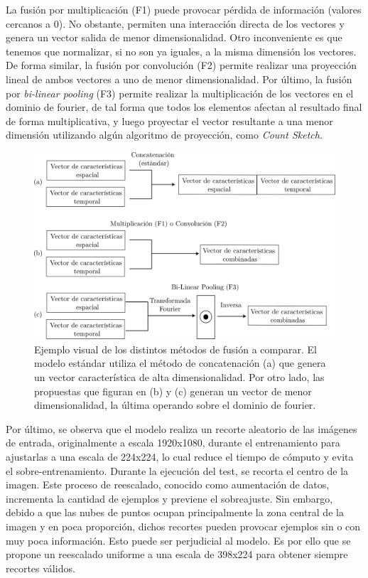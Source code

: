 La fusión por multiplicación (F1) puede provocar pérdida de información (valores cercanos a 0). 
No obstante, permiten una interacción directa de los vectores y genera un vector salida 
de menor dimensionalidad. Otro inconveniente es que tenemos que normalizar, si no son 
ya iguales, a la misma dimensión los vectores. De forma similar, la fusión por convolución (F2)
permite realizar una proyección lineal de ambos vectores a uno de menor dimensionalidad. 
Por último, la fusión por \emph{bi-linear pooling} (F3) permite realizar la multiplicación de 
los vectores en el dominio de fourier, de tal forma que todos los elementos afectan al 
resultado final de forma multiplicativa, y luego proyectar 
el vector resultante a una menor dimensión utilizando algún algoritmo de proyección, 
como \emph{Count Sketch}. 

\begin{figure}[htp]
  \begin{center}
    \includegraphics[width=.8\textwidth]{imagenes/chapter5/FeatureFusionExample}
  \end{center}
  \caption[Ejemplo visual de los distintos métodos de fusión a comparar.]{Ejemplo visual de los distintos métodos de fusión a comparar.
   El modelo estándar utiliza el método de concatenación (a) que genera un vector 
 característica de alta dimensionalidad. 
Por otro lado, las propuestas que figuran en (b) y (c) generan un vector de 
menor dimensionalidad, la última operando sobre el dominio de fourier.
}
  \label{fig:FeatureFusionExample}
\end{figure}

Por último, se observa que el modelo realiza un recorte aleatorio de las imágenes de entrada, 
originalmente a escala 1920x1080, durante el entrenamiento 
para ajustarlas a una escala de 224x224, lo cual reduce el tiempo de cómputo y 
evita el sobre-entrenamiento. Durante la ejecución del test, se recorta el centro de la imagen. 
Este proceso de reescalado, conocido como aumentación de datos, incrementa la cantidad de ejemplos 
y previene el sobreajuste. Sin embargo, debido a que las nubes de puntos ocupan principalmente 
la zona central de la imagen y en poca proporción, dichos recortes pueden provocar 
ejemplos sin o con muy poca información. Esto puede ser perjudicial al modelo. 
Es por ello que se propone un reescalado uniforme a una escala de 
398x224 para obtener siempre recortes válidos.

